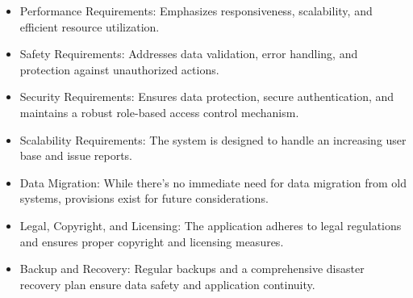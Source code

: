 \begin{itemize}
    \item Performance Requirements: Emphasizes responsiveness, scalability, and efficient resource utilization.
    \item Safety Requirements: Addresses data validation, error handling, and protection against unauthorized actions.
    \item Security Requirements: Ensures data protection, secure authentication, and maintains a robust role-based access control mechanism.
    \item Scalability Requirements: The system is designed to handle an increasing user base and issue reports.
    \item Data Migration: While there's no immediate need for data migration from old systems, provisions exist for future considerations.
    \item Legal, Copyright, and Licensing: The application adheres to legal regulations and ensures proper copyright and licensing measures.
    \item Backup and Recovery: Regular backups and a comprehensive disaster recovery plan ensure data safety and application continuity.
\end{itemize}